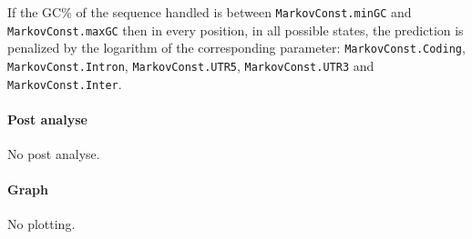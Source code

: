 If the GC\% of the sequence handled is between
\texttt{MarkovConst.minGC} and \texttt{MarkovConst.maxGC} then in
every position, in all possible states, the prediction is penalized by
the logarithm of the corresponding parameter:
\texttt{MarkovConst.Coding}, \texttt{MarkovConst.Intron},
\texttt{MarkovConst.UTR5}, \texttt{MarkovConst.UTR3} and
\texttt{MarkovConst.Inter}.

\paragraph{Post analyse}

No post analyse.

\paragraph{Graph}

No plotting.

